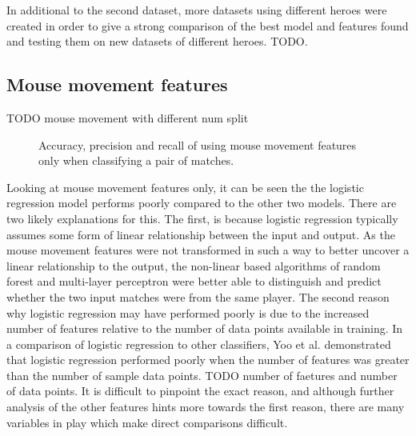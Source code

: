 \documentclass[Report.tex]{subfiles}
\newcommand{\baraxis}[7]{
\begin{axis}[
    ybar,
    title={#1},
    width=#5,
    height=#6,
    ymin=#3, ymax=#4,
    bar width=1em,
    legend style={at={#7},anchor=north,legend columns=-1},
    enlarge x limits=0.4,
    x tick label style={align=center,text width=1.7cm},
    symbolic x coords={Logistic Regression, Random Forest, Multi-layer Perceptron},
    xtick=data,
    ylabel={#2}
]
}
\newcommand{\plotbar}[5]{
\addplot+[
	discard if not={numSplits}{#1},
	discard if not={split}{#2},
	discard if not={features}{#3},
] table [x=model, y=#4,col sep=comma] {data/20-pair-cv.csv};
\addlegendentry{#5}
}
\begin{document}
In additional to the second dataset, more datasets using different heroes were created in order to give a strong comparison of the best model and features found and testing them on new datasets of different heroes. TODO. 

\subsection{Mouse movement features}

TODO mouse movement with different num split

\begin{figure}[H]
\centering
{}
\caption{Accuracy, precision and recall of using mouse movement features only when classifying a pair of matches.}
\end{figure}

Looking at mouse movement features only, it can be seen the the logistic regression model performs poorly compared to the other two models. There are two likely explanations for this. The first, is because logistic regression typically assumes some form of linear relationship between the input and output. As the mouse movement features were not transformed in such a way to better uncover a linear relationship to the output, the non-linear based algorithms of random forest and multi-layer perceptron were better able to distinguish and predict whether the two input matches were from the same player. The second reason why logistic regression may have performed poorly is due to the increased number of features relative to the number of data points available in training. In a comparison of logistic regression to other classifiers, Yoo et al. \cite{lr-vs-rf} demonstrated that logistic regression performed poorly when the number of features was greater than the number of sample data points. TODO number of faetures and number of data points. It is difficult to pinpoint the exact reason, and although further analysis of the other features hints more towards the first reason, there are many variables in play which make direct comparisons difficult. 
\end{document}

